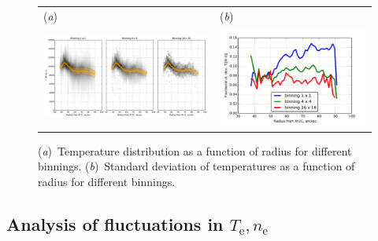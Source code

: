 \documentclass[preprint, 10pt]{aastex}
\newcommand\elec{\ensuremath{_{\mathrm{e}}}}
\newcommand\Te{\ensuremath{T\elec}}
\newcommand\Ne{\ensuremath{n\elec}}
\begin{document}
\begin{figure}
  \centering
  \begin{tabular}{ll}
    (\textit{a}) & (\textit{b}) \\
    \includegraphics[height=0.35\textheight]{Tnii-vs-radius-binning} &
    \includegraphics[height=0.25\textheight]{sigma-Tnii-vs-radius-binning}
  \end{tabular}
  \caption{(\textit{a})~Temperature distribution as a function of
    radius for different binnings.  (\textit{b})~Standard deviation of
    temperatures as a function of radius for different binnings. 
  }
  \label{fig:tnii-vs-rad}
\end{figure}


\subsection{\boldmath Analysis of fluctuations in \(\Te, \Ne\)}
\label{sec:fluct}
\end{document}
